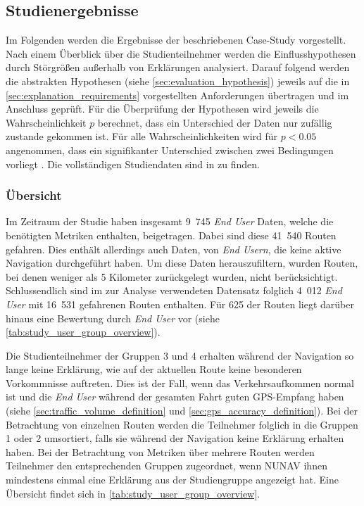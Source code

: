 \subsection{Studienergebnisse}
\label{sec:study_results_quantitativ}

Im Folgenden werden die Ergebnisse der beschriebenen Case-Study vorgestellt. Nach einem Überblick über die Studienteilnehmer werden die Einflusshypothesen durch Störgrößen außerhalb von Erklärungen analysiert. Darauf folgend werden die abstrakten Hypothesen (siehe \autoref{sec:evaluation_hypothesis}) jeweils auf die in \autoref{sec:explanation_requirements} vorgestellten Anforderungen übertragen und im Anschluss geprüft. Für die Überprüfung der Hypothesen wird jeweils die Wahrscheinlichkeit $ p $ berechnet, dass ein Unterschied der Daten nur zufällig zustande gekommen ist. Für alle Wahrscheinlichkeiten wird für $ p < 0.05 $ angenommen, dass ein signifikanter Unterschied zwischen zwei Bedingungen vorliegt \cite[vgl.][]{wohlin2012experimentation}. Die vollständigen Studiendaten sind in  zu finden.

\subsubsection{Übersicht}

Im Zeitraum der Studie haben insgesamt 9~745 \textit{End User} Daten, welche die benötigten Metriken enthalten, beigetragen. Dabei sind diese 41~540 Routen gefahren. Dies enthält allerdings auch Daten, von \textit{End Usern}, die keine aktive Navigation durchgeführt haben. Um diese Daten herauszufiltern, wurden Routen, bei denen weniger als 5 Kilometer zurückgelegt wurden, nicht berücksichtigt. Schlussendlich sind im zur Analyse verwendeten Datensatz folglich 4~012 \textit{End User} mit 16~531 gefahrenen Routen enthalten. Für 625 der Routen liegt darüber hinaus eine Bewertung durch \textit{End User} vor (siehe \autoref{tab:study_user_group_overview}).

Die Studienteilnehmer der Gruppen 3 und 4 erhalten während der Navigation so lange keine Erklärung, wie auf der aktuellen Route keine besonderen Vorkommnisse auftreten. Dies ist der Fall, wenn das Verkehrsaufkommen \glqq normal\grqq{} ist und die \textit{End User} während der gesamten Fahrt guten GPS-Empfang haben (siehe \autoref{sec:traffic_volume_definition} und \autoref{sec:gps_accuracy_definition}). Bei der Betrachtung von einzelnen Routen werden die Teilnehmer folglich in die Gruppen 1 oder 2 umsortiert, falls sie während der Navigation keine Erklärung erhalten haben. Bei der Betrachtung von Metriken über mehrere Routen werden Teilnehmer den entsprechenden Gruppen zugeordnet, wenn NUNAV ihnen mindestens einmal eine Erklärung aus der Studiengruppe angezeigt hat. Eine Übersicht findet sich in \autoref{tab:study_user_group_overview}.

